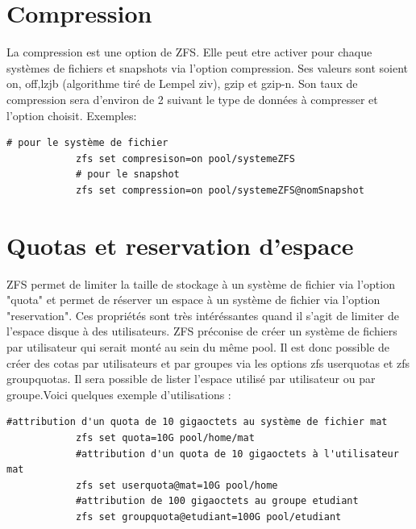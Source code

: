 \documentclass[a4paper]{report}
\begin{document}
	\section{Compression}
		La compression est une option de ZFS. Elle peut etre activer pour chaque systèmes de fichiers et snapshots via l'option compression. Ses valeurs sont soient on, off,lzjb (algorithme tiré de Lempel ziv), gzip et gzip-n. Son taux de compression sera d'environ de 2 suivant le type de données à compresser et l'option choisit. Exemples:
		\begin{lstlisting}[language=ksh,texcl]
			# pour le système de fichier
			zfs set compresison=on pool/systemeZFS 
			# pour le snapshot
			zfs set compression=on pool/systemeZFS@nomSnapshot 
		\end{lstlisting}
	\section{Quotas et reservation d'espace}
		ZFS permet de limiter la taille de stockage à un système de fichier via l'option "quota" et permet de réserver un espace à un système de fichier via l'option "reservation". Ces propriétés sont très intéréssantes quand il s'agit de limiter de l'espace disque à des utilisateurs. ZFS préconise de créer un système de fichiers par utilisateur qui serait monté au sein du même pool. Il est donc possible de créer des cotas par utilisateurs et par groupes via les options zfs userquotas et zfs groupquotas. Il sera possible de lister l'espace utilisé par utilisateur ou par groupe.Voici quelques exemple d'utilisations :
		\begin{lstlisting}[language=ksh,texcl]
			#attribution d'un quota de 10 gigaoctets au système de fichier mat
			zfs set quota=10G pool/home/mat 
			#attribution d'un quota de 10 gigaoctets à l'utilisateur mat
			zfs set userquota@mat=10G pool/home 
			#attribution de 100 gigaoctets au groupe etudiant
			zfs set groupquota@etudiant=100G pool/etudiant 
		\end{lstlisting}
\end{document}
